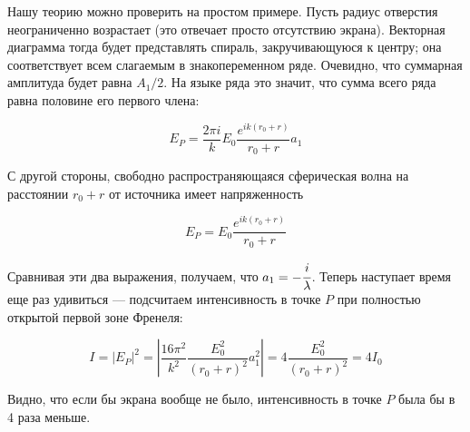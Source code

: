 \documentclass[11pt,a4paper]{article}
\numberwithin{equation}{section}
\begin{document}
\begin{figure}
  \vspace{-0.7cm}
  \begin{center}
  \end{center}
  \label{fig:spiral}
\end{figure}

Нашу теорию можно проверить на простом примере. Пусть радиус отверстия
неограниченно возрастает (это отвечает просто отсутствию
экрана). Векторная диаграмма тогда будет представлять спираль,
закручивающуюся к центру; она соответствует всем слагаемым в
знакопеременном ряде.  Очевидно, что суммарная амплитуда будет равна
$A_1/2$. На языке ряда это значит, что сумма всего ряда равна половине
его первого члена:

\begin{equation}
E_P = \frac{2\pi i}{k} E_0 \frac{e^{i k (r_0 + r)}}{r_0 + r} a_1
\end{equation}

С другой стороны, свободно распространяющаяся сферическая волна на
расстоянии $r_0 + r$ от источника имеет напряженность

\begin{equation}
E_P = E_0 \frac{e^{i k (r_0 + r)}}{r_0 + r}
\end{equation}

Сравнивая эти два выражения, получаем, что $a_1 =
-\cfrac{i}{\lambda}$. Теперь наступает время еще раз удивиться ---
подсчитаем интенсивность в точке $P$ при полностью открытой первой зоне
Френеля:

\begin{equation}
I = |E_P|^2 =\left| \frac{16 \pi^2}{k^2} \frac{E_0^2}{(r_0 + r)^2} a_1^2 \right|= 4 \frac{E_0^2}{(r_0+r)^2} = 4I_0
\end{equation}

Видно, что если бы экрана вообще не было, интенсивность в точке $P$ была
бы в 4 раза меньше.

\end{document}
